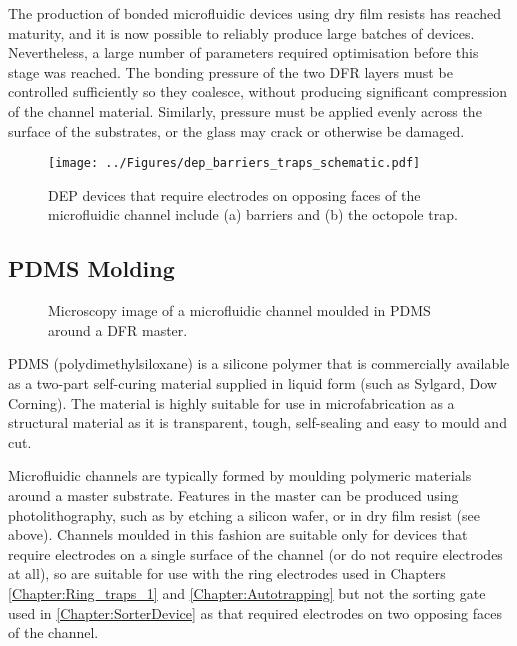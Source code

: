 The production of bonded microfluidic devices using dry film resists has reached maturity, and it is now possible to reliably produce large batches of devices. Nevertheless, a large number of parameters required optimisation before this stage was reached. The bonding pressure of the two DFR layers must be controlled sufficiently so they coalesce, without producing significant compression of the channel material. Similarly, pressure must be applied evenly across the surface of the substrates, or the glass may crack or otherwise be damaged.


\begin{figure}[b]
	\centering
		\texttt{[image: ../Figures/dep\_barriers\_traps\_schematic.pdf]}
	\caption[DEP devices that require electrodes on opposing faces of the microfluidic channel.]{DEP devices that require electrodes on opposing faces of the microfluidic channel include (a) barriers and (b) the octopole trap.}
	\label{fig:dep_barriers_traps_schematic}
\end{figure}

\subsection{PDMS Molding}
\label{Section:PDMS_molding}
\begin{figure}[t]
 \centering
 \caption{Microscopy image of a microfluidic channel moulded in PDMS around a DFR master.}
 \label{fig:PDMS_channel_and_master}
\end{figure}

PDMS (polydimethylsiloxane) is a silicone polymer that is commercially available as a two-part self-curing material supplied in liquid form (such as Sylgard, Dow Corning). The material is highly suitable for use in microfabrication as a structural material as it is transparent, tough, self-sealing and easy to mould and cut.

Microfluidic channels are typically formed by moulding polymeric materials around a master substrate. Features in the master can be produced using photolithography, such as by etching a silicon wafer, or in dry film resist (see above). Channels moulded in this fashion are suitable only for devices that require electrodes on a single surface of the channel (or do not require electrodes at all), so are suitable for use with the ring electrodes used in Chapters \ref{Chapter:Ring_traps_1} and \ref{Chapter:Autotrapping} but not the sorting gate used in \cref{Chapter:SorterDevice} as that required electrodes on two opposing faces of the channel.

